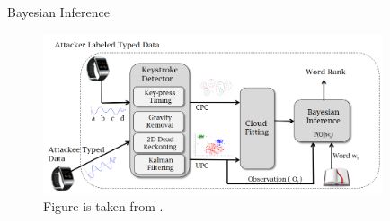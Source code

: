 \documentclass[ucs,9pt]{beamer}
\begin{document}
\begin{frame}{Bayesian Inference}
\begin{figure}
	\centering
	\includegraphics[width=10cm]{imgs/moleOverview}
	\caption{Figure is taken from \cite{b1}.}
\end{figure}
\end{frame}
\end{document}
